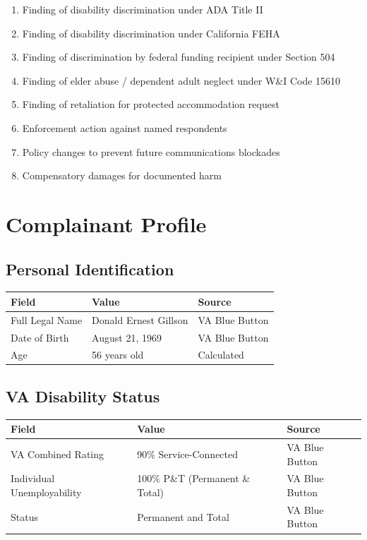 \documentclass[12pt,letterpaper]{article}
\begin{document}
\begin{enumerate}[noitemsep]
    \item Finding of disability discrimination under ADA Title II
    \item Finding of disability discrimination under California FEHA
    \item Finding of discrimination by federal funding recipient under Section 504
    \item Finding of elder abuse / dependent adult neglect under W\&I Code 15610
    \item Finding of retaliation for protected accommodation request
    \item Enforcement action against named respondents
    \item Policy changes to prevent future communications blockades
    \item Compensatory damages for documented harm
\end{enumerate}

\newpage

\section{Complainant Profile}

\subsection{Personal Identification}

\begin{center}
\begin{tabular}{lll}
\toprule
\textbf{Field} & \textbf{Value} & \textbf{Source} \\
\midrule
Full Legal Name & Donald Ernest Gillson & VA Blue Button \\
Date of Birth & August 21, 1969 & VA Blue Button \\
Age & 56 years old & Calculated \\
\bottomrule
\end{tabular}
\end{center}

\subsection{VA Disability Status}

\begin{center}
\begin{tabular}{lll}
\toprule
\textbf{Field} & \textbf{Value} & \textbf{Source} \\
\midrule
VA Combined Rating & 90\% Service-Connected & VA Blue Button \\
Individual Unemployability & 100\% P\&T (Permanent \& Total) & VA Blue Button \\
Status & Permanent and Total & VA Blue Button \\
\bottomrule
\end{tabular}
\end{center}
\end{document}
